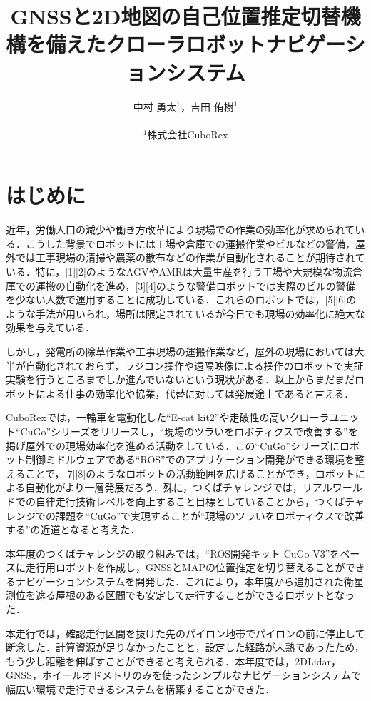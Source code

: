 \documentclass[platex,dvipdfmx]{rbproceedings}
\title{GNSSと2D地図の自己位置推定切替機構を備えたクローラロボットナビゲーションシステム}
\author{%
中村 勇太${}^{1}$，吉田 侑樹${}^{1}$\\ \\
${}^{1}$株式会社CuboRex
}
\begin{document}
\maketitle


\section{はじめに}
近年，労働人口の減少や働き方改革により現場での作業の効率化が求められている．こうした背景でロボットには工場や倉庫での運搬作業やビルなどの警備，屋外では工事現場の清掃や農薬の散布などの作業が自動化されることが期待されている．特に，[1][2]のようなAGVやAMRは大量生産を行う工場や大規模な物流倉庫での運搬の自動化を進め，[3][4]のような警備ロボットでは実際のビルの警備を少ない人数で運用することに成功している．これらのロボットでは，[5][6]のような手法が用いられ，場所は限定されているが今日でも現場の効率化に絶大な効果を与えている．

しかし，発電所の除草作業や工事現場の運搬作業など，屋外の現場においては大半が自動化されておらず，ラジコン操作や遠隔映像による操作のロボットで実証実験を行うところまでしか進んでいないという現状がある．以上からまだまだロボットによる仕事の効率化や協業，代替に対しては発展途上であると言える．

CuboRexでは，一輪車を電動化した“E-cat kit2”や走破性の高いクローラユニット“CuGo”シリーズをリリースし，“現場のツラいをロボティクスで改善する”を掲げ屋外での現場効率化を進める活動をしている．この“CuGo”シリーズにロボット制御ミドルウェアである“ROS”でのアプリケーション開発ができる環境を整えることで，[7][8]のようなロボットの活動範囲を広げることができ，ロボットによる自動化がより一層発展だろう．殊に，つくばチャレンジでは，リアルワールドでの自律走行技術レベルを向上すること目標としていることから，つくばチャレンジでの課題を“CuGo”で実現することが“現場のツラいをロボティクスで改善する”の近道となると考えた．

本年度のつくばチャレンジの取り組みでは，“ROS開発キット CuGo V3”をベースに走行用ロボットを作成し，GNSSとMAPの位置推定を切り替えることができるナビゲーションシステムを開発した．これにより，本年度から追加された衛星測位を遮る屋根のある区間でも安定して走行することができるロボットとなった．

本走行では，確認走行区間を抜けた先のパイロン地帯でパイロンの前に停止して断念した．計算資源が足りなかったことと，設定した経路が未熟であったため，もう少し距離を伸ばすことができると考えられる．本年度では，2DLidar，GNSS，ホイールオドメトリのみを使ったシンプルなナビゲーションシステムで幅広い環境で走行できるシステムを構築することができた．
\end{document}
